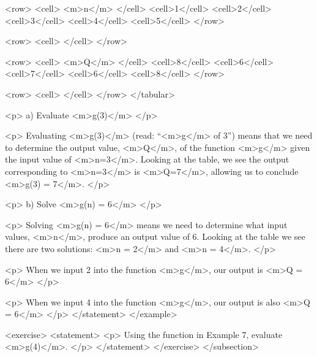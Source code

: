                     <row>
                        <cell> <m>n</m> </cell>
                        <cell>1</cell>
                        <cell>2</cell>
                        <cell>3</cell>
                        <cell>4</cell>
                        <cell>5</cell>
                    </row>

                    <row>
                        <cell> </cell>
                    </row>

                    <row>
                        <cell> <m>Q</m> </cell>
                        <cell>8</cell>
                        <cell>6</cell>
                        <cell>7</cell>
                        <cell>6</cell>
                        <cell>8</cell>
                    </row>

                    <row>
                        <cell> </cell>
                    </row>
                </tabular>

                <p>
                    a) Evaluate <m>g(3)</m>
                </p>

                <p>
                    Evaluating <m>g(3)</m> (read: “<m>g</m> of 3”) means that we need to determine the output value, <m>Q</m>, of the function <m>g</m> given the input value of <m>n=3</m>.
                    Looking at the table, we see the output corresponding to <m>n=3</m> is <m>Q=7</m>, allowing us to conclude <m>g(3) = 7</m>.
                </p>

                <p>
                    b) Solve <m>g(n) = 6</m>
                </p>

                <p>
                    Solving <m>g(n) = 6</m> means we need to determine what input values, <m>n</m>, produce an output value of 6.
                    Looking at the table we see there are two solutions: <m>n = 2</m> and <m>n = 4</m>.
                </p>

                <p>
                    When we input 2 into the function <m>g</m>, our output is <m>Q = 6</m>
                </p>

                <p>
                    When we input 4 into the function <m>g</m>, our output is also <m>Q = 6</m>
                </p>
            </statement>
        </example>

        <exercise>
            <statement>
                <p>
                    Using the function in Example 7, evaluate <m>g(4)</m>.
                </p>
            </statement>
        </exercise>
    </subsection>


